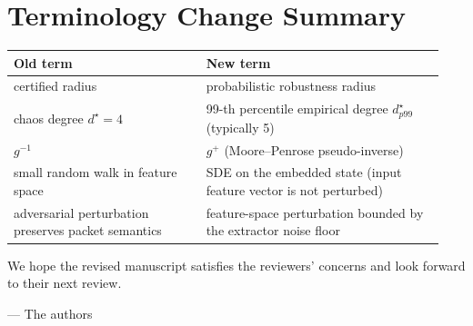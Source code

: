 \documentclass[11pt,letterpaper]{article}
\begin{document}
\section*{Terminology Change Summary}
\begin{center}\small
\begin{tabular}{@{}p{0.42\linewidth}p{0.52\linewidth}@{}}
\toprule
\textbf{Old term} & \textbf{New term} \\
\midrule
certified radius            & probabilistic robustness radius \\
chaos degree $d^\star=4$    & 99-th percentile empirical degree $d^\star_{p99}$ (typically 5) \\
$g^{-1}$                    & $g^{+}$ (Moore--Penrose pseudo-inverse) \\
small random walk in feature space & SDE on the embedded state (input feature vector is not perturbed) \\
adversarial perturbation preserves packet semantics & feature-space perturbation bounded by the extractor noise floor \\
\bottomrule
\end{tabular}
\end{center}

\vspace{6pt}
We hope the revised manuscript satisfies the reviewers' concerns and
look forward to their next review.

\vspace{6pt}
\hfill --- The authors
\end{document}
